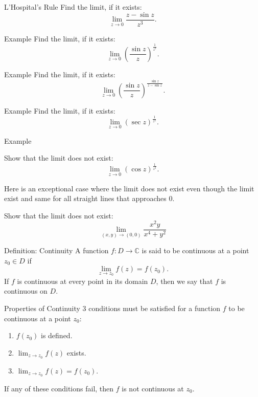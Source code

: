 \documentclass[11pt]{beamer}
\theoremstyle{plain}
\begin{document}
\begin{frame}{L'Hospital's Rule}
Find the limit, if it exists:
\[
\lim_{z\to 0}\frac{z-\sin z}{z^3}.
\]
\end{frame}

\begin{frame}{Example}
Find the limit, if it exists:
\[
\lim_{z\to 0}\left(\frac{\sin z}{z}\right)^{\frac{1}{z^2}}.
\]
\end{frame}

\begin{frame}{Example}
Find the limit, if it exists:
\[
\lim_{z\to 0}\left(\frac{\sin z}{z}\right)^{\frac{\sin z}{\,z-\sin z\,}}.
\]
\end{frame}

\begin{frame}{Example}
Find the limit, if it exists:
\[
\lim_{z\to 0} (\sec z)^{\frac{1}{z^2}}.
\]
\end{frame}

\begin{frame}{Example}
\begin{example}
Show that the limit does not exist:
\[
\lim_{z\to 0} (\cos z)^{\frac{1}{z^3}}.
\]
\end{example}
Here is an exceptional case where the limit does not exist even though the limit exist and same for all straight lines that approaches $0$.   
\begin{example}
Show that the limit does not exist:
\[
\lim_{(x,y)\rightarrow(0,0)}\frac{x^2y}{x^4+y^2}
\]
\end{example}
\end{frame}


\begin{frame}{Definition: Continuity}
A function $f : D \to \mathbb{C}$ is said to be continuous at a point $z_0 \in D$ if
\[
\lim_{z\to z_0} f(z) = f(z_0).
\]
If $f$ is continuous at every point in its domain $D$, then we say that $f$ is
continuous on $D$.
\end{frame}

\begin{frame}{Properties of Continuity}
$3$ conditions must be satisfied for a function $f$ to be continuous at a point $z_0$:
\begin{enumerate}
  \item $f(z_0)$ is defined.
  \item $\displaystyle \lim_{z\to z_0} f(z)$ exists.
  \item $\displaystyle \lim_{z\to z_0} f(z)=f(z_0)$.
\end{enumerate}
If any of these conditions fail, then $f$ is not continuous at $z_0$.
\end{frame}
\end{document}
